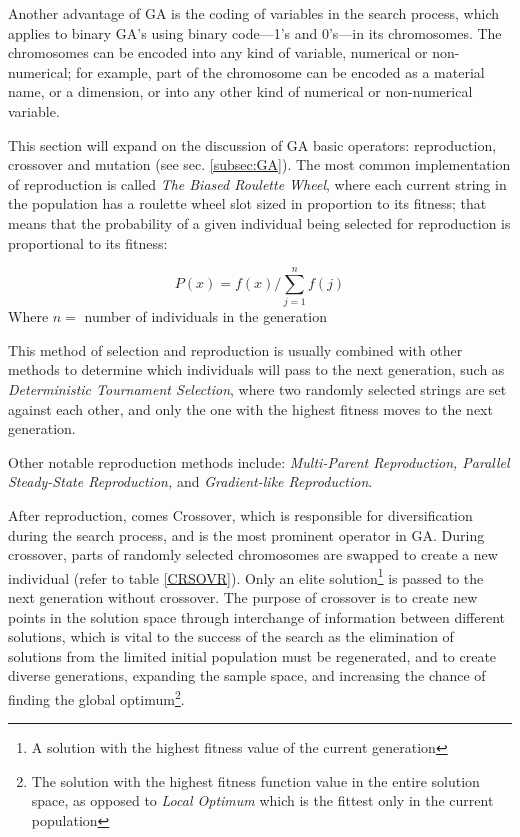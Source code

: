 Another advantage of GA is the coding of variables in the search process, which applies to binary GA's using binary code---1's and 0's---in its chromosomes. The chromosomes can be encoded into any kind of variable, numerical or non-numerical; for example, part of the chromosome can be encoded as a material name, or a dimension, or into any other kind of numerical or non-numerical variable.

This section will expand on the discussion of GA basic operators: reproduction, crossover and mutation (see sec. \ref{subsec:GA}). The most common implementation of reproduction is called \emph{The Biased Roulette Wheel}, where each current string in the population has a roulette wheel slot sized in proportion to its fitness; that means that the probability of a given individual being selected for reproduction is proportional to its fitness:

\begin{equation}
P(x)=f(x)/ \sum\limits_{j=1}^n f(j) 
\label{eqn:BiasedRoulette}
\end{equation}
\small Where $n=$ number of individuals in the generation
\normalsize

This method of selection and reproduction is usually combined with other methods to determine which individuals will pass to the next generation, such as \emph{Deterministic Tournament Selection}, where two randomly selected strings are set against each other, and only the one with the highest fitness moves to the next generation.

Other notable reproduction methods include: \emph{Multi-Parent Reproduction, Parallel Steady-State Reproduction,} and \emph{Gradient-like Reproduction}.

After reproduction, comes Crossover, which is responsible for diversification during the search process, and is the most prominent operator in GA. During crossover, parts of randomly selected chromosomes are swapped to create a new individual (refer to table \ref{CRSOVR}). Only an elite solution\footnote{A solution with the highest fitness value of the current generation} is passed to the next generation without crossover. The purpose of crossover is to create new points in the solution space through interchange of information between different solutions, which is vital to the success of the search as the elimination of solutions from the limited initial population must be regenerated, and to create diverse generations, expanding the sample space, and increasing the chance of finding the global optimum\footnote{The solution with the highest fitness function value in the entire solution space, as opposed to \emph{Local Optimum} which is the fittest only in the current population}.

